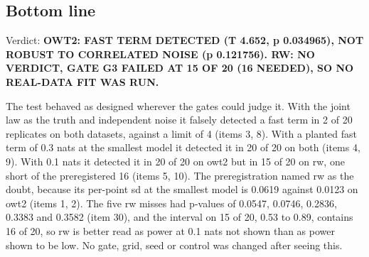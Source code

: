 
\subsection*{Bottom line}

Verdict: \textbf{OWT2: FAST TERM DETECTED (T 4.652, p 0.034965), NOT ROBUST TO CORRELATED NOISE (p 0.121756). RW: NO VERDICT, GATE G3 FAILED AT 15 OF 20 (16 NEEDED), SO NO REAL-DATA FIT WAS RUN.}

The test behaved as designed wherever the gates could judge it. With the joint law as the truth and independent noise it falsely detected a fast term in 2 of 20 replicates on both datasets, against a limit of 4 (items 3, 8). With a planted fast term of 0.3 nats at the smallest model it detected it in 20 of 20 on both (items 4, 9). With 0.1 nats it detected it in 20 of 20 on owt2 but in 15 of 20 on rw, one short of the preregistered 16 (items 5, 10). The preregistration named rw as the doubt, because its per-point sd at the smallest model is 0.0619 against 0.0123 on owt2 (items 1, 2). The five rw misses had p-values of 0.0547, 0.0746, 0.2836, 0.3383 and 0.3582 (item 30), and the interval on 15 of 20, 0.53 to 0.89, contains 16 of 20, so rw is better read as power at 0.1 nats not shown than as power shown to be low. No gate, grid, seed or control was changed after seeing this.

